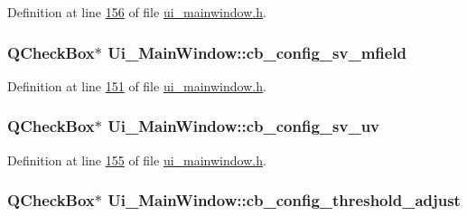 Definition at line \hyperlink{a00052_source_l00156}{156} of file \hyperlink{a00052_source}{ui\+\_\+mainwindow.\+h}.

\hypertarget{a00027_a0a83284035ab2dbaeb39946522434986}{
\subsubsection[{cb\+\_\+config\+\_\+sv\+\_\+mfield}]{\setlength{\rightskip}{0pt plus 5cm}Q\+Check\+Box$\ast$ Ui\+\_\+\+Main\+Window\+::cb\+\_\+config\+\_\+sv\+\_\+mfield}}\label{a00027_a0a83284035ab2dbaeb39946522434986}


Definition at line \hyperlink{a00052_source_l00151}{151} of file \hyperlink{a00052_source}{ui\+\_\+mainwindow.\+h}.

\hypertarget{a00027_a3a93cd0a3f3738aad252d063a8677839}{
\subsubsection[{cb\+\_\+config\+\_\+sv\+\_\+uv}]{\setlength{\rightskip}{0pt plus 5cm}Q\+Check\+Box$\ast$ Ui\+\_\+\+Main\+Window\+::cb\+\_\+config\+\_\+sv\+\_\+uv}}\label{a00027_a3a93cd0a3f3738aad252d063a8677839}


Definition at line \hyperlink{a00052_source_l00155}{155} of file \hyperlink{a00052_source}{ui\+\_\+mainwindow.\+h}.

\hypertarget{a00027_a433ffc427e1103e6c2939f949ee5e5b5}{
\subsubsection[{cb\+\_\+config\+\_\+threshold\+\_\+adjust}]{\setlength{\rightskip}{0pt plus 5cm}Q\+Check\+Box$\ast$ Ui\+\_\+\+Main\+Window\+::cb\+\_\+config\+\_\+threshold\+\_\+adjust}}\label{a00027_a433ffc427e1103e6c2939f949ee5e5b5}


